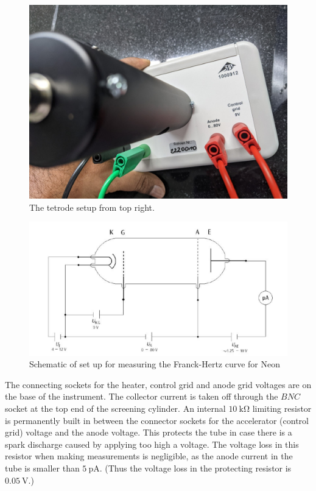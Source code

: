 \documentclass[%
 reprint,
 amsmath,amssymb,
 aps,
]{revtex4-2}
\begin{document}
    \begin{figure}
        \centering
        \includegraphics[scale = 0.12]{Figures/tetrodeup2.jpg}
        \caption{The tetrode setup from top right.}
        \label{fig:tetrodeUp2}
    \end{figure}
    \begin{figure}
    \includegraphics[scale = 0.5]{Figures/schematic.png}
    \caption{\label{fig:wide}Schematic of set up for measuring the Franck-Hertz curve for Neon}
    \end{figure}
    \par
    The connecting sockets for the heater, control grid and anode grid voltages are on the base of the instrument. The collector current is taken off through the $BNC$ socket at the top end of the screening cylinder. An internal $\SI{10}{\kilo \ohm}$ limiting resistor is permanently built in between the connector sockets for the accelerator (control grid) voltage and the anode voltage. This protects the tube in case there is a spark discharge caused by applying too high a voltage. The voltage loss in this resistor when making measurements is negligible, as the anode current in the tube is smaller than $\SI{5}{\pico \ampere}$. (Thus the voltage loss in the protecting resistor is $\SI{0.05}{\volt}$.)
\end{document}
